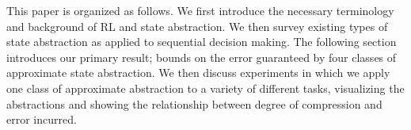 This paper is organized as follows. We first introduce the necessary terminology and background of \ac{RL} and state abstraction. We then survey existing types of state abstraction as applied to sequential decision making. The following section introduces our primary result; bounds on the error guaranteed by four classes of approximate state abstraction. We then discuss experiments in which we apply one class of approximate abstraction to a variety of different tasks, visualizing the abstractions and showing the relationship between degree of compression and error incurred.
